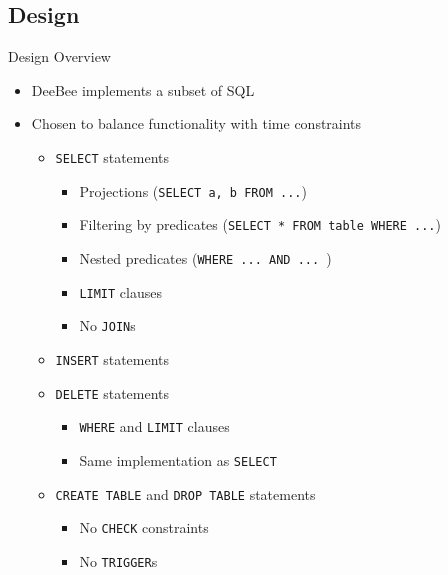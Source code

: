 \documentclass{beamer}
\begin{document}
\subsection{Design}
\begin{frame}{Design Overview} 
  \begin{itemize}
    \item DeeBee implements a subset of SQL \pause
    \item Chosen to balance functionality with time constraints \pause
    \begin{itemize}
      \item \texttt{SELECT} statements  \pause
        \begin{itemize}
            \item Projections (\texttt{SELECT a, b FROM ...})  \pause
            \item Filtering by predicates (\texttt{SELECT * FROM table WHERE ...})  \pause
            \item Nested predicates  (\texttt{WHERE ... AND ... })  \pause
            \item \texttt{LIMIT} clauses  \pause
            \item No \texttt{JOIN}s  \pause
          \end{itemize}
      \item \texttt{INSERT} statements  \pause
      \item \texttt{DELETE} statements  \pause
        \begin{itemize}
          \item \texttt{WHERE} and \texttt{LIMIT} clauses  \pause
          \item Same implementation as \texttt{SELECT}  \pause
        \end{itemize}
      \item \texttt{CREATE TABLE} and \texttt{DROP TABLE} statements  \pause
      \begin{itemize}
        \item No \texttt{CHECK} constraints  \pause
        \item No \texttt{TRIGGER}s  \pause
      \end{itemize}
    \end{itemize}
  \end{itemize}
\end{frame}
\end{document}
